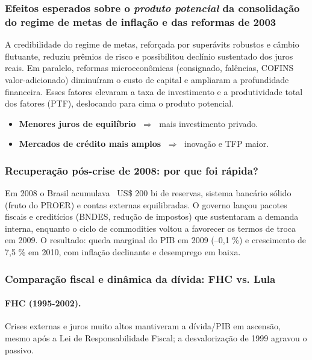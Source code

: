 \documentclass[a4paper,12pt]{article}[abntex2]
\begin{document}
\subsubsection{\textbf{Efeitos esperados sobre o \emph{produto potencial} da consolidação do regime de metas de inflação e das reformas de 2003}}

A credibilidade do regime de metas, reforçada por superávits robustos e câmbio flutuante, reduziu prêmios de risco e possibilitou declínio sustentado dos juros reais. Em paralelo, reformas microeconômicas (consignado, falências, COFINS valor-adicionado) diminuíram o custo de capital e ampliaram a profundidade financeira. Esses fatores elevaram a taxa de investimento e a produtividade total dos fatores (PTF), deslocando para cima o produto potencial. 

\begin{itemize}
  \item \textbf{Menores juros de equilíbrio} $\;\Rightarrow\;$ mais investimento privado.
  \item \textbf{Mercados de crédito mais amplos} $\;\Rightarrow\;$ inovação e TFP maior.
\end{itemize}

\subsubsection{\textbf{Recuperação pós-crise de 2008: por que foi rápida?}}

Em 2008 o Brasil acumulava ~US\$ 200 bi de reservas, sistema bancário sólido (fruto do PROER) e contas externas equilibradas. O governo lançou pacotes fiscais e creditícios (BNDES, redução de impostos) que sustentaram a demanda interna, enquanto o ciclo de commodities voltou a favorecer os termos de troca em 2009. O resultado: queda marginal do PIB em 2009 (–0,1 \%) e crescimento de 7,5 \% em 2010, com inflação declinante e desemprego em baixa. 

\subsubsection{\textbf{Comparação fiscal e dinâmica da dívida: FHC vs. Lula}}

\paragraph{FHC (1995-2002).} Crises externas e juros muito altos mantiveram a dívida/PIB em ascensão, mesmo após a Lei de Responsabilidade Fiscal; a desvalorização de 1999 agravou o passivo.   
\end{document}
